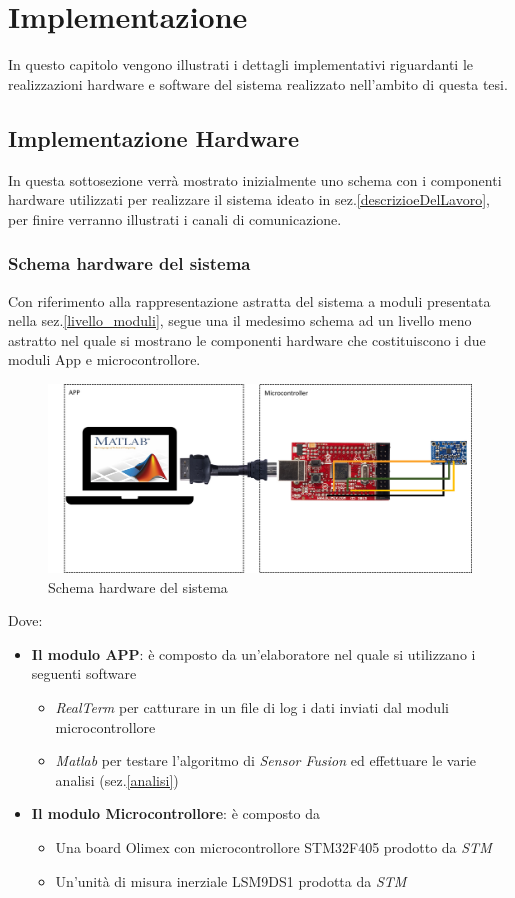 \chapter{Implementazione}
\label{implementazione}
In questo capitolo vengono illustrati i dettagli implementativi riguardanti le realizzazioni hardware e software del sistema realizzato nell'ambito di questa tesi.

\section{Implementazione Hardware}
\label{impl_hardware}
In questa sottosezione verrà mostrato inizialmente uno schema con i componenti hardware utilizzati per realizzare il sistema ideato in sez.\ref{descrizioeDelLavoro}, per finire verranno illustrati i canali di comunicazione.
\subsection{Schema hardware del sistema}
Con riferimento alla rappresentazione astratta del sistema a moduli presentata nella sez.\ref{livello_moduli}, segue una il medesimo schema ad un livello meno astratto nel quale si mostrano le componenti hardware che costituiscono i due moduli App e microcontrollore.
\begin{figure}
	\includegraphics[width=\textwidth]{implementazione/schemaHardware.png}
	\caption{Schema hardware del sistema}
	\label{fig:schemaHardware}
\end{figure}
\newpage
Dove:
\begin{itemize}
	\item \textbf{Il modulo APP}: è composto da un'elaboratore nel quale si utilizzano i seguenti software
	\begin{itemize}
	\item \textit{RealTerm} per catturare in un file di log i dati inviati dal moduli microcontrollore
	\item \textit{Matlab} per testare l'algoritmo di \textit{Sensor Fusion} ed effettuare le varie analisi (sez.\ref{analisi})
	\end{itemize}
	\item \textbf{Il modulo Microcontrollore}: è composto da
	\begin{itemize}
		\item Una board Olimex con microcontrollore STM32F405 prodotto da \textit{STM}
		\item Un'unità di misura inerziale LSM9DS1 prodotta da \textit{STM}
	\end{itemize}
\end{itemize}
